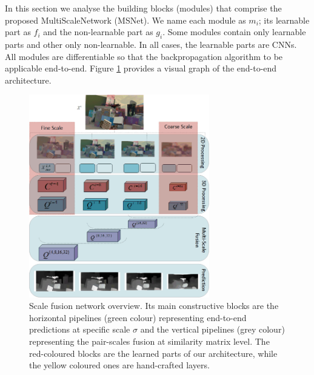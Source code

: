 \documentclass[runningheads]{llncs}
\begin{document}
In this section we analyse the building blocks (modules) that comprise the proposed MultiScaleNetwork (MSNet). We name each module as $m_i$; its learnable part as $f_i$ and the non-learnable part as $g_i$. Some modules contain only learnable parts and other only non-learnable. In all cases, the learnable parts are CNNs. All modules are differentiable so that the backpropagation algorithm to be applicable end-to-end. Figure \ref{fig:cnn_architecture} provides a visual graph of the end-to-end architecture.

\begin{figure}[!htbp]
    \centering
    \includegraphics[width=0.7\textwidth]{figures/stereo_architecture.png}
    \caption{Scale fusion network overview. Its main constructive blocks are the horizontal pipelines (green colour) representing end-to-end predictions at specific scale $\sigma$ and the vertical pipelines (grey colour) representing the pair-scales fusion at similarity matrix level. The red-coloured blocks are the learned parts of our architecture, while the yellow coloured ones are hand-crafted layers.}
    \label{fig:cnn_architecture}
\end{figure}

    
    
\end{document}
